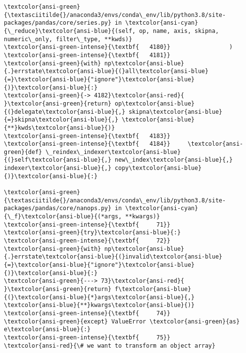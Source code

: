 \documentclass[11pt]{article}
\begin{document}
\begin{Verbatim}[commandchars=\\\{\}, frame=single, framerule=2mm, rulecolor=\color{outerrorbackground}]
\textcolor{ansi-green}{\textasciitilde{}/anaconda3/envs/conda\_env/lib/python3.8/site-packages/pandas/core/series.py} in \textcolor{ansi-cyan}{\_reduce}\textcolor{ansi-blue}{(self, op, name, axis, skipna, numeric\_only, filter\_type, **kwds)}
\textcolor{ansi-green-intense}{\textbf{   4180}}                 )
\textcolor{ansi-green-intense}{\textbf{   4181}}             \textcolor{ansi-green}{with} np\textcolor{ansi-blue}{.}errstate\textcolor{ansi-blue}{(}all\textcolor{ansi-blue}{=}\textcolor{ansi-blue}{"ignore"}\textcolor{ansi-blue}{)}\textcolor{ansi-blue}{:}
\textcolor{ansi-green}{-> 4182}\textcolor{ansi-red}{                 }\textcolor{ansi-green}{return} op\textcolor{ansi-blue}{(}delegate\textcolor{ansi-blue}{,} skipna\textcolor{ansi-blue}{=}skipna\textcolor{ansi-blue}{,} \textcolor{ansi-blue}{**}kwds\textcolor{ansi-blue}{)}
\textcolor{ansi-green-intense}{\textbf{   4183}} 
\textcolor{ansi-green-intense}{\textbf{   4184}}     \textcolor{ansi-green}{def} \_reindex\_indexer\textcolor{ansi-blue}{(}self\textcolor{ansi-blue}{,} new\_index\textcolor{ansi-blue}{,} indexer\textcolor{ansi-blue}{,} copy\textcolor{ansi-blue}{)}\textcolor{ansi-blue}{:}

\textcolor{ansi-green}{\textasciitilde{}/anaconda3/envs/conda\_env/lib/python3.8/site-packages/pandas/core/nanops.py} in \textcolor{ansi-cyan}{\_f}\textcolor{ansi-blue}{(*args, **kwargs)}
\textcolor{ansi-green-intense}{\textbf{     71}}             \textcolor{ansi-green}{try}\textcolor{ansi-blue}{:}
\textcolor{ansi-green-intense}{\textbf{     72}}                 \textcolor{ansi-green}{with} np\textcolor{ansi-blue}{.}errstate\textcolor{ansi-blue}{(}invalid\textcolor{ansi-blue}{=}\textcolor{ansi-blue}{"ignore"}\textcolor{ansi-blue}{)}\textcolor{ansi-blue}{:}
\textcolor{ansi-green}{---> 73}\textcolor{ansi-red}{                     }\textcolor{ansi-green}{return} f\textcolor{ansi-blue}{(}\textcolor{ansi-blue}{*}args\textcolor{ansi-blue}{,} \textcolor{ansi-blue}{**}kwargs\textcolor{ansi-blue}{)}
\textcolor{ansi-green-intense}{\textbf{     74}}             \textcolor{ansi-green}{except} ValueError \textcolor{ansi-green}{as} e\textcolor{ansi-blue}{:}
\textcolor{ansi-green-intense}{\textbf{     75}}                 \textcolor{ansi-red}{\# we want to transform an object array}


\end{Verbatim}
\end{document}
